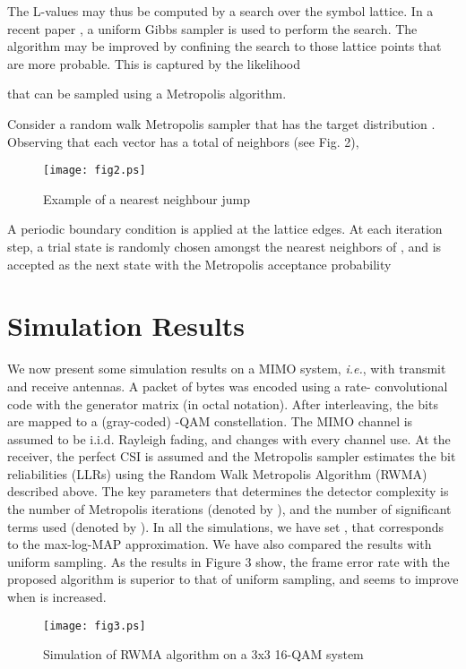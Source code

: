 \documentclass[pre,12pt,aps]{revtex4}
\begin{document}
The L-values may thus be computed by a search over the symbol lattice. 
In a recent paper \cite{fbzs}, a uniform Gibbs sampler is used 
to perform the search. The algorithm may be improved by 
confining  the search to those lattice points that 
are more probable. This is captured by the likelihood 
 
that can be sampled using a Metropolis algorithm.

Consider a random walk Metropolis sampler that has the 
target distribution 
. 
Observing 
that each vector   has a total of   neighbors
(see Fig. 2),

\begin{figure}[hp]
\centering
\texttt{[image: fig2.ps]}
\caption{Example of a nearest neighbour jump}
\end{figure}

A periodic boundary condition is applied at the lattice edges. 
At each iteration step, a trial state is randomly chosen 
amongst  the nearest neighbors of , and is accepted as the next 
state with the Metropolis acceptance probability 

\section{Simulation Results}

We now present some simulation results on a 
 MIMO system, {\it i.e.}, with  transmit and 
 receive antennas. A packet of  bytes was 
encoded using a rate- convolutional code 
with the generator matrix  (in octal notation).  
After interleaving, the bits are mapped to 
a (gray-coded) -QAM constellation. The MIMO 
channel is assumed to be i.i.d. Rayleigh fading, 
and changes with every channel use. At the receiver, 
the perfect CSI is assumed and the Metropolis sampler 
estimates the bit reliabilities (LLRs) using the Random 
Walk Metropolis Algorithm (RWMA) described above. 
The key parameters that determines the detector 
complexity is the number of Metropolis iterations 
(denoted by ), and the number of significant 
terms used (denoted by ). 
In all the  simulations, we have set , that corresponds 
to the max-log-MAP approximation. We have also compared 
the results with uniform sampling. As the results 
in Figure 3 show, the frame error rate with the 
proposed algorithm is superior to that of uniform 
sampling, and seems to improve when   is increased.  


\begin{figure}
\centering
\texttt{[image: fig3.ps]}
\caption{
Simulation of RWMA algorithm on a 
3x3 16-QAM system
}
\end{figure}
\end{document}
